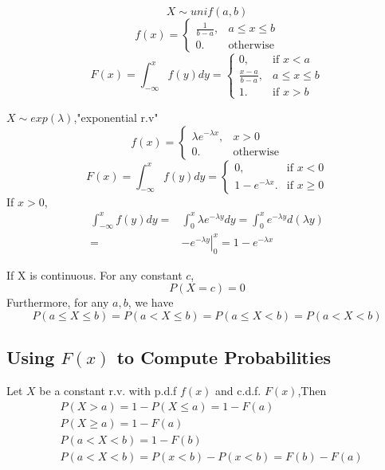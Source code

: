 \begin{exmp}
\[X \sim unif(a,b)\]
\[f(x)=\begin{cases}
\frac{1}{b-a}, 	&a \leq x \leq b\\
0. &\text{otherwise}
\end{cases}\]
\[F(x)=\int_{-\infty}^{x}f(y)dy=\begin{cases}
0,		&\text{if } x < a \\
\frac{x-a}{b-a}, 	&a \leq x \leq b\\
1. 		&\text{if } x > b 
\end{cases}\]
\end{exmp}

\begin{exmp}
$X \sim exp(\lambda)$,"exponential r.v"
\[f(x)=\begin{cases}
\lambda e^{-\lambda x}, 	& x >0\\
0. &\text{otherwise}
\end{cases}\]
\[F(x)=\int_{-\infty}^{x}f(y)dy=\begin{cases}
0,		&\text{if } x < 0 \\
1-e^{-\lambda x}. 		&\text{if } x \geq 0
\end{cases}\]
If $x>0$,
\begin{align*}
\int_{-\infty}^{x}f(y)dy= & \int_{0}^{x}\lambda e^{-\lambda y}dy=\int_{0}^{x}e^{-\lambda y}d(\lambda y)\\
= & \left.-e^{-\lambda y}\right|_0^x =1-e^{-\lambda x}
\end{align*}
\end{exmp}

\begin{prop}
If X is continuous. For any constant $c$,
\[P(X=c)=0\]
Furthermore, for any $a,b$, we have
\[P(a \leq X \leq b)=P(a <X\leq b)=P(a \leq X< b)=P(a <X< b)\]
\end{prop}



\subsection{Using $F(x)$ to Compute Probabilities}
Let $X$ be a constant r.v. with p.d.f $f(x)$ and c.d.f. $F(x)$,Then
\begin{align*}
&P(X>a)=1-P(X\leq a)=1-F(a)\\
&P(X \geq a)=1-F(a)	\\
&P(a < X <b)=1-F(b)	\\
&P(a<X<b)=P(x<b)-P(x<b)=F(b)-F(a)
\end{align*}

